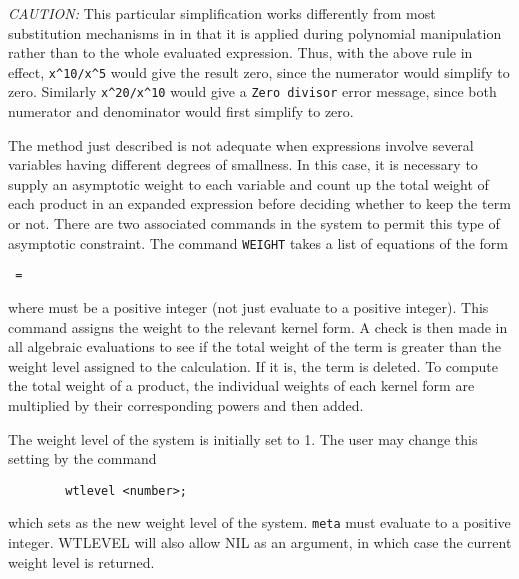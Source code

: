 \textit{CAUTION:}  This particular simplification works differently from most
substitution mechanisms in {\REDUCE} in that it is applied during
polynomial manipulation rather than to the whole evaluated expression.
Thus, with the above rule in effect, 
\texttt{x\textasciicircum 10/x\textasciicircum 5} would give the
result zero, since the numerator would simplify to zero.  Similarly
\texttt{x\textasciicircum 20/x\textasciicircum 10} would give a 
\texttt{Zero divisor} error message,
since both numerator and denominator would first simplify to zero.

\hypertarget{command:WEIGHT}{}
The method just described is not adequate when expressions involve several
variables having different degrees of smallness. In this case, it is
necessary to supply an asymptotic weight to each variable and count up the
total weight of each product in an expanded expression before deciding
whether to keep the term or not. There are two associated commands in the
system to permit this type of asymptotic constraint. The command 
\texttt{WEIGHT}
takes a list of equations of the form
\begin{syntax}
  \texttt{ = }
\end{syntax}
where  must be a positive integer (not just evaluate to a
positive integer).  This command assigns the weight  to the
relevant kernel form.  A check is then made in all algebraic evaluations
to see if the total weight of the term is greater than the weight level
assigned to the calculation.  If it is, the term is deleted.  To compute
the total weight of a product, the individual weights of each kernel form
are multiplied by their corresponding powers and then added.

\hypertarget{command:WTLEVEL}{}
The weight level of the system is initially set to 1. The user may change
this setting by the command
\begin{verbatim}
        wtlevel <number>;
\end{verbatim}
which sets  as the new weight level of the system.
\texttt{meta} must evaluate to a positive integer.  WTLEVEL will also
allow NIL as an argument, in which case the current weight level is returned.
